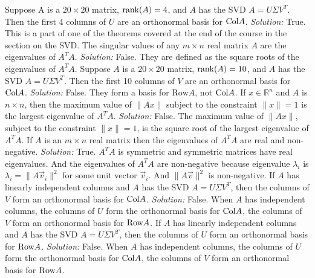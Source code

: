 \ifnum {}         
    Suppose A is a $20 \times 20$ matrix, $\text{rank}(A)=4$, and $A$ has the SVD $A = U\Sigma V^T$. Then the first $4$ columns of $U$ are an orthonormal basis for $\text{Col} A$. 
    \ifnum {} {\color{DarkBlue} \textit{Solution:  } True. This is a part of one of the theorems covered at the end of the course in the section on the SVD.} \fi
\fi
\ifnum {}      
    The singular values of any $m\times n$ real matrix $A$ are the eigenvalues of $A^TA$.
    \ifnum {} {\color{DarkBlue} \textit{Solution:  } False. They are defined as the square roots of the eigenvalues of $A^TA$.} \fi
\fi    
\ifnum {}  
    Suppose $A$ is a $20 \times 20$ matrix, $\text{rank}(A)=10$, and $A$ has the SVD $A = U\Sigma V^T$. Then the first 10 columns of $V$ are an orthonormal basis for $\text{Col} A$. 
    \ifnum {} {\color{DarkBlue} \textit{Solution:  } False. They form a basis for $\text{Row} A$, not $\text{Col} A$. } \fi
\fi    
\ifnum {}    
    If $x \in \mathbb R^n$ and $A$ is $n\times n$, then the maximum value of $\|Ax\|$ subject to the constraint $\|x\|=1$ is the largest eigenvalue of $A^TA$.
    \ifnum {} {\color{DarkBlue} \textit{Solution:  } False. The maximum value of $\|Ax\|$, subject to the constraint $\|x\|=1$, is the square root of the largest eigenvalue of $A^TA$. } \fi
\fi   
\ifnum {}    
    If $A$ is an $m\times n$ real matrix then the eigenvalues of $A^TA$ are real and non-negative. 
    \ifnum {} {\color{DarkBlue} \textit{Solution:  } True. $A^TA$ is symmetric and symmetric matrices have real eigenvalues. And the eigenvalues of $A^TA$ are non-negative because eigenvalue $\lambda_i$ is $\lambda_i = \|A\vec v_i\|^2$ for some unit vector $\vec v_i$. And $\|A\vec v\|^2$  is non-negative.   } \fi
\fi    
\ifnum {}      
    If $A$ has linearly independent columns and $A$ has the SVD $A = U\Sigma V^T$, then the columns of $V$ form an orthonormal basis for $\text{Col} A$.
    \ifnum {} {\color{DarkBlue} \textit{Solution:  } False. When $A$ has independent columns, the columns of $U$ form the orthonormal basis for $\text{Col} A$, the columns of $V$ form an orthonormal basis for $\text{Row} A$.   } \fi
\fi     
\ifnum {} 
 If $A$ has linearly independent columns and $A$ has the SVD $A = U\Sigma V^T$, then the columns of $U$ form an orthonormal basis for $\text{Row} A$.
    \ifnum {} {\color{DarkBlue} \textit{Solution:  } False. When $A$ has independent columns, the columns of $U$ form the orthonormal basis for $\text{Col} A$, the columns of $V$ form an orthonormal basis for $\text{Row} A$.   }\fi
